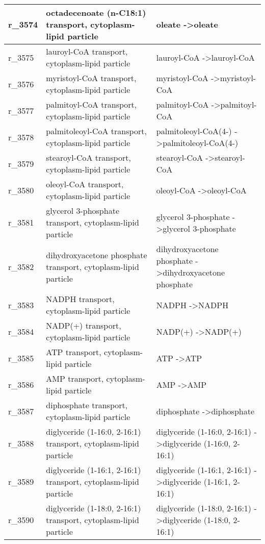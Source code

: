 \begin{landscape}
{\begin{longtable}{|l|p{7cm}|p{15cm}|}
r\_3574 & octadecenoate (n-C18:1) transport, cytoplasm-lipid particle & oleate  -\textgreater oleate \\ \hline
r\_3575 & lauroyl-CoA transport, cytoplasm-lipid particle & lauroyl-CoA  -\textgreater lauroyl-CoA \\ \hline
r\_3576 & myristoyl-CoA transport, cytoplasm-lipid particle & myristoyl-CoA  -\textgreater myristoyl-CoA \\ \hline
r\_3577 & palmitoyl-CoA transport, cytoplasm-lipid particle & palmitoyl-CoA  -\textgreater palmitoyl-CoA \\ \hline
r\_3578 & palmitoleoyl-CoA transport, cytoplasm-lipid particle & palmitoleoyl-CoA(4-)  -\textgreater palmitoleoyl-CoA(4-) \\ \hline
r\_3579 & stearoyl-CoA transport, cytoplasm-lipid particle & stearoyl-CoA  -\textgreater stearoyl-CoA \\ \hline
r\_3580 & oleoyl-CoA transport, cytoplasm-lipid particle & oleoyl-CoA  -\textgreater oleoyl-CoA \\ \hline
r\_3581 & glycerol 3-phosphate transport, cytoplasm-lipid particle & glycerol 3-phosphate  -\textgreater glycerol 3-phosphate \\ \hline
r\_3582 & dihydroxyacetone phosphate transport, cytoplasm-lipid particle & dihydroxyacetone phosphate  -\textgreater dihydroxyacetone phosphate \\ \hline
r\_3583 & NADPH transport, cytoplasm-lipid particle & NADPH  -\textgreater NADPH \\ \hline
r\_3584 & NADP(+) transport, cytoplasm-lipid particle & NADP(+)  -\textgreater NADP(+) \\ \hline
r\_3585 & ATP transport, cytoplasm-lipid particle & ATP  -\textgreater ATP \\ \hline
r\_3586 & AMP transport, cytoplasm-lipid particle & AMP  -\textgreater AMP \\ \hline
r\_3587 & diphosphate transport, cytoplasm-lipid particle & diphosphate  -\textgreater diphosphate \\ \hline
r\_3588 & diglyceride (1-16:0, 2-16:1) transport, cytoplasm-lipid particle & diglyceride (1-16:0, 2-16:1)  -\textgreater diglyceride (1-16:0, 2-16:1) \\ \hline
r\_3589 & diglyceride (1-16:1, 2-16:1) transport, cytoplasm-lipid particle & diglyceride (1-16:1, 2-16:1)  -\textgreater diglyceride (1-16:1, 2-16:1) \\ \hline
r\_3590 & diglyceride (1-18:0, 2-16:1) transport, cytoplasm-lipid particle & diglyceride (1-18:0, 2-16:1)  -\textgreater diglyceride (1-18:0, 2-16:1) \\ \hline

\end{longtable}}
\end{landscape}

